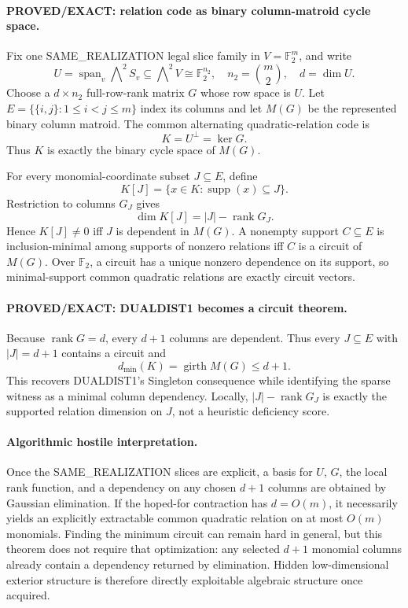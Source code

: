 \documentclass[11pt]{article}
\begin{document}
\paragraph{PROVED/EXACT: relation code as binary column-matroid cycle space.}
Fix one SAME\_REALIZATION legal slice family in \(V=\mathbb F_2^m\), and write
\[
U=\operatorname{span}_v\bigwedge\nolimits^2S_v\subseteq\bigwedge\nolimits^2V\cong\mathbb F_2^{n_2},
\quad n_2=\binom m2,\quad d=\dim U.
\]
Choose a \(d\times n_2\) full-row-rank matrix \(G\) whose row space is \(U\). Let \(E=\{\{i,j\}:1\le i<j\le m\}\) index its columns and let \(M(G)\) be the represented binary column matroid. The common alternating quadratic-relation code is
\[
K=U^\perp=\ker G.
\]
Thus \(K\) is exactly the binary cycle space of \(M(G)\).

For every monomial-coordinate subset \(J\subseteq E\), define
\[
K[J]=\{x\in K:\operatorname{supp}(x)\subseteq J\}.
\]
Restriction to columns \(G_J\) gives
\[
\boxed{\dim K[J]=|J|-\operatorname{rank}G_J.}
\]
Hence \(K[J]\ne0\) iff \(J\) is dependent in \(M(G)\). A nonempty support \(C\subseteq E\) is inclusion-minimal among supports of nonzero relations iff \(C\) is a circuit of \(M(G)\). Over \(\mathbb F_2\), a circuit has a unique nonzero dependence on its support, so minimal-support common quadratic relations are exactly circuit vectors.

\paragraph{PROVED/EXACT: DUALDIST1 becomes a circuit theorem.}
Because \(\operatorname{rank}G=d\), every \(d+1\) columns are dependent. Thus every \(J\subseteq E\) with \(|J|=d+1\) contains a circuit and
\[
d_{\min}(K)=\operatorname{girth}M(G)\le d+1.
\]
This recovers DUALDIST1's Singleton consequence while identifying the sparse witness as a minimal column dependency. Locally, \(|J|-\operatorname{rank}G_J\) is exactly the supported relation dimension on \(J\), not a heuristic deficiency score.

\paragraph{Algorithmic hostile interpretation.}
Once the SAME\_REALIZATION slices are explicit, a basis for \(U\), \(G\), the local rank function, and a dependency on any chosen \(d+1\) columns are obtained by Gaussian elimination. If the hoped-for contraction has \(d=O(m)\), it necessarily yields an explicitly extractable common quadratic relation on at most \(O(m)\) monomials. Finding the minimum circuit can remain hard in general, but this theorem does not require that optimization: any selected \(d+1\) monomial columns already contain a dependency returned by elimination. Hidden low-dimensional exterior structure is therefore directly exploitable algebraic structure once acquired.
\end{document}
